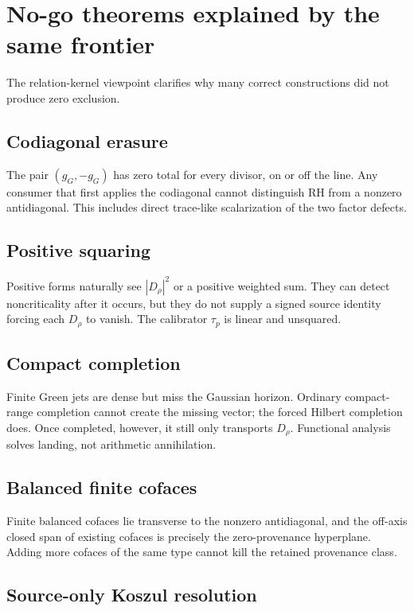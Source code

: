 \documentclass[11pt]{article}
\theoremstyle{definition}
\theoremstyle{remark}
\numberwithin{equation}{section}
\begin{document}
\section{No-go theorems explained by the same frontier}

The relation-kernel viewpoint clarifies why many correct constructions did
not produce zero exclusion.

\subsection{Codiagonal erasure}

The pair $(g_G,-g_G)$ has zero total for every divisor, on or off the line.
Any consumer that first applies the codiagonal cannot distinguish RH from a
nonzero antidiagonal.  This includes direct trace-like scalarization of the
two factor defects.

\subsection{Positive squaring}

Positive forms naturally see $|D_\rho|^2$ or a positive weighted sum.  They
can detect noncriticality after it occurs, but they do not supply a signed
source identity forcing each $D_\rho$ to vanish.  The calibrator $\tau_p$ is
linear and unsquared.

\subsection{Compact completion}

Finite Green jets are dense but miss the Gaussian horizon.  Ordinary
compact-range completion cannot create the missing vector; the forced
Hilbert completion does.  Once completed, however, it still only transports
$D_\rho$.  Functional analysis solves landing, not arithmetic annihilation.

\subsection{Balanced finite cofaces}

Finite balanced cofaces lie transverse to the nonzero antidiagonal, and
the off-axis closed span of existing cofaces is precisely the zero-provenance
hyperplane.  Adding more cofaces of the same type cannot kill the retained
provenance class.

\subsection{Source-only Koszul resolution}
\end{document}
